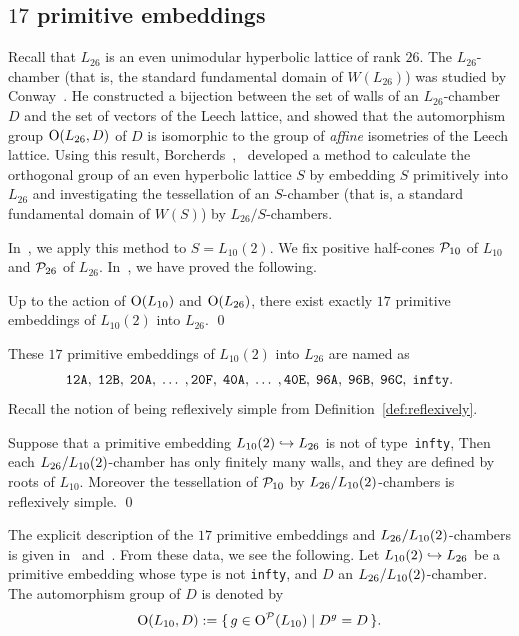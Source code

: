 \documentclass{amsart}
\numberwithin{procedure}{section}
\begin{document}
\subsection{$17$ primitive embeddings}\label{subsec:17}
%
Recall that $L_{26}$ is an even unimodular hyperbolic lattice
of rank $26$.
The $L_{26}$-chamber (that is, the standard fundamental domain of $W(L_{26})$)
was studied by Conway~\cite{Conway1983}.
He constructed a bijection between the set of walls of 
an $L_{26}$-chamber $D$ and the set of vectors of the Leech lattice,
and showed that the automorphism group $\mathord{\mathrm{O}}(L_{26}, D)$ of $D$ is
isomorphic to the group of \emph{affine} isometries of the Leech lattice.
Using this result,
Borcherds~\cite{Bor1},~\cite{Bor2} developed a method
to calculate the orthogonal group of an even  hyperbolic lattice $S$
by embedding $S$ primitively into $L_{26}$
and investigating the tessellation of 
an $S$-chamber (that is, a standard fundamental domain of $W(S)$)
by $L_{26}/S$-chambers.
%
\par
%
In~\cite{BS2019},
we apply this method to $S=L_{10}(2)$.
We fix positive half-cones  $\mathord{\mathcal P}_{10}$ of $L_{10}$ and $\mathord{\mathcal P}_{26}$ of $L_{26}$.
In~\cite{BS2019},
we have proved the following.
%
\begin{theorem}[\cite{BS2019}]\label{thm:17}
Up to the action of $\mathord{\mathrm{O}}(L_{10})$ and $\mathord{\mathrm{O}}(L_{26})$,
there exist exactly $17$ primitive embeddings of
$L_{10}(2)$ into $L_{26}$.
\qed
\end{theorem}
%
These $17$ primitive embeddings of $L_{10}(2)$ into $L_{26}$ are named as
\[
{\tt 12A},\;
{\tt 12B},\;
{\tt  20A},\; \dots\;,
{\tt 20F},\;
{\tt 40A},\;  \dots\;,
{\tt 40E},\;
{\tt 96A},\;
{\tt 96B},\;
{\tt 96C},\;
{\tt infty}.
\]
%
Recall the notion of being reflexively simple from Definition~\ref{def:reflexively}.
%
\begin{theorem}[\cite{BS2019}]\label{thm:16simples}
Suppose that 
a primitive embedding $L_{10}(2)\hookrightarrow L_{26}$ 
is  not of type~{\tt infty},
Then 
each $L_{26}/L_{10}(2)$-chamber has only finitely many walls, and 
they are defined by roots of $L_{10}$.
Moreover the tessellation of $\mathord{\mathcal P}_{10}$ by $L_{26}/L_{10}(2)$-chambers is reflexively simple.
\qed
\end{theorem}
%
The explicit description of the $17$ primitive embeddings
and $L_{26}/L_{10}(2)$-chambers
is given in~\cite{BS2019} and~\cite{BrandhorstShimadaCompData}.
From these data, we see the following.
Let $L_{10}(2) \hookrightarrow L_{26}$ be a primitive embedding
whose type is not  {\tt infty},
and $D$ an $L_{26}/L_{10}(2)$-chamber.
The automorphism group of $D$ is denoted by
\[
\mathord{\mathrm{O}}(L_{10}, D):=\{\,{g\in \mathord{\mathrm{O}}^{\mathord{\mathcal P}}(L_{10})}\mid {D^g=D} \,\}.
\]
\end{document}

